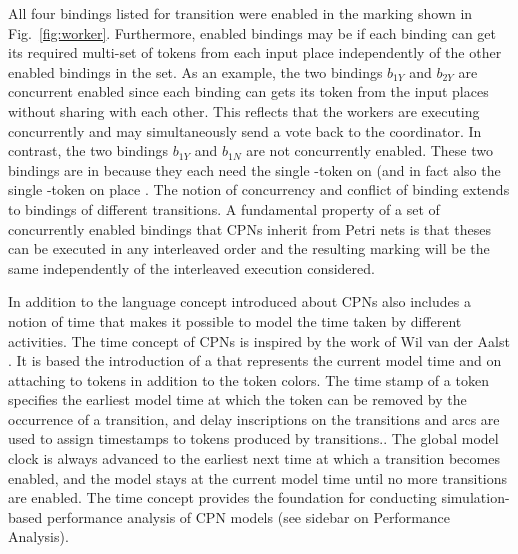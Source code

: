 All four bindings listed for transition 
were enabled in the marking shown in
Fig.~\ref{fig:worker}. Furthermore, enabled bindings may be
 if each binding can get its required
multi-set of tokens from each input place independently of the other
enabled bindings in the set. As an example, the two bindings $b_{1Y}$
and $b_{2Y}$ are concurrent enabled since each binding can gets its
token from the input places without sharing with each other. This
reflects that the workers are executing concurrently and may
simultaneously send a vote back to the coordinator. In contrast, the
two bindings $b_{1Y}$ and $b_{1N}$ are not concurrently enabled. These
two bindings are in  because they each need the
single -token on  (and in fact also the
single -token on place . The notion
of concurrency and conflict of binding extends to bindings of
different transitions. A fundamental property of a set of concurrently
enabled bindings that CPNs inherit from Petri nets is that theses can
be executed in any interleaved order and the resulting marking will be
the same independently of the interleaved execution considered.

In addition to the language concept introduced about CPNs also
includes a notion of time that makes it possible to model the time
taken by different activities. The time concept of CPNs is inspired by
the work of Wil van der Aalst \cite{X}. It is based the introduction
of a  that represents the current model
time and on attaching  to tokens in addition to
the token colors. The time stamp of a token specifies the earliest
model time at which the token can be removed by the occurrence of a
transition, and delay inscriptions on the transitions and arcs are used
to assign timestamps to tokens produced by transitions.. The global
model clock is always advanced to the earliest next time at which a
transition becomes enabled, and the model stays at the current model
time until no more transitions are enabled. The time concept provides
the foundation for conducting simulation-based performance analysis of
CPN models (see sidebar on Performance Analysis).

